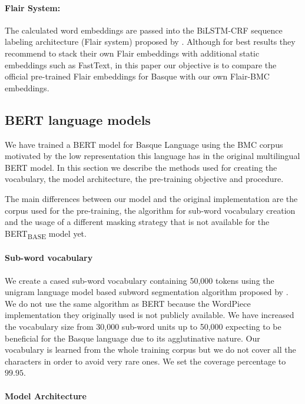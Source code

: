 \documentclass[10pt, a4paper]{article}
\begin{document}
\paragraph{Flair System:}  The calculated word embeddings are passed into the BiLSTM-CRF sequence labeling architecture (Flair system) proposed by \cite{huang2015bidirectional}. Although for best results they recommend to stack their own Flair embeddings with additional static embeddings such as FastText, in this paper our objective is to compare the official pre-trained Flair embeddings for Basque with our own Flair-BMC embeddings.

\subsection{BERT language models}\label{sec:build-basq-models:bert}

We have trained a BERT \cite{devlin2019bert} model for Basque Language using the BMC corpus motivated by the low representation this language has in the original multilingual BERT model. In this section we describe the methods used for creating the vocabulary, the model architecture, the pre-training objective and procedure.

The main differences between our model and the original implementation are the corpus used for the pre-training, the algorithm for sub-word vocabulary creation and the usage of a different masking strategy that is not available for the BERT\textsubscript{BASE} model yet. 

\paragraph{Sub-word vocabulary}

We create a cased sub-word vocabulary containing 50,000 tokens using the unigram language model based subword segmentation algorithm proposed by . We do not use the same algorithm as BERT because the WordPiece \cite{wu2016google} implementation they originally used is not publicly available. We have increased the vocabulary size from 30,000 sub-word units up to 50,000 expecting to be beneficial for the Basque language due to its agglutinative nature. Our vocabulary is learned from the whole training corpus but we do not cover all the characters in order to avoid very rare ones. We set the coverage percentage to $99.95$. 

\paragraph{Model Architecture}
\end{document}
